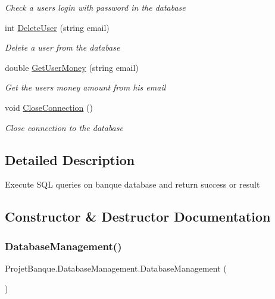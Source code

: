 \begin{DoxyCompactItemize}
\begin{DoxyCompactList}\small\item\em Check a user\textquotesingle{}s login with password in the database \end{DoxyCompactList}\item 
int \mbox{\hyperlink{class_projet_banque_1_1_database_management_a1bc7a22d48a79809b752806bcbf1107a}{Delete\+User}} (string email)
\begin{DoxyCompactList}\small\item\em Delete a user from the database \end{DoxyCompactList}\item 
double \mbox{\hyperlink{class_projet_banque_1_1_database_management_aeee42ee61e0e0a96a7927bf408956881}{Get\+User\+Money}} (string email)
\begin{DoxyCompactList}\small\item\em Get the user\textquotesingle{}s money amount from his email \end{DoxyCompactList}\item 
void \mbox{\hyperlink{class_projet_banque_1_1_database_management_aa825c23c3dd06796b8243ce8ed7c6bfb}{Close\+Connection}} ()
\begin{DoxyCompactList}\small\item\em Close connection to the database \end{DoxyCompactList}\end{DoxyCompactItemize}


\subsection{Detailed Description}
Execute S\+QL queries on banque database and return success or result 



\subsection{Constructor \& Destructor Documentation}
\mbox{\label{class_projet_banque_1_1_database_management_a595d794798b5b753d9d43c623a679abc}} 
\subsubsection{\texorpdfstring{DatabaseManagement()}{DatabaseManagement()}}
{\footnotesize\ttfamily Projet\+Banque.\+Database\+Management.\+Database\+Management (\begin{DoxyParamCaption}{ }\end{DoxyParamCaption})}



